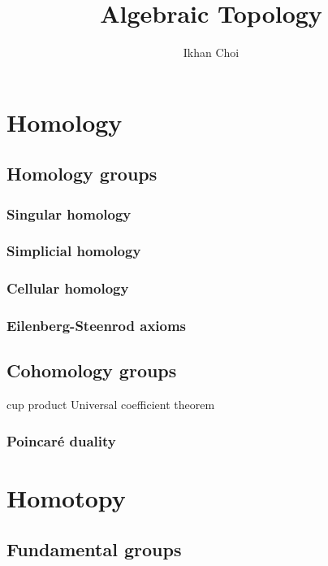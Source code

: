 \documentclass{../../large}
\begin{document}
\title{Algebraic Topology}
\author{Ikhan Choi}
\maketitle
\tableofcontents


\part{Homology}

\chapter{Homology groups}
\section{Singular homology}
\section{Simplicial homology}
\section{Cellular homology}
\section{Eilenberg-Steenrod axioms}

\chapter{Cohomology groups}

cup product
Universal coefficient theorem

\section{Poincar\'e duality}

\chapter{}



\part{Homotopy}
\chapter{Fundamental groups}
\end{document}
